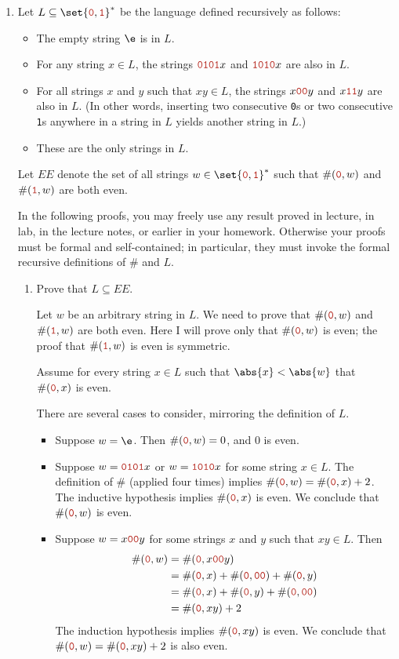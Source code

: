 \documentclass[11pt]{article}
\def\Sym#1{\texttt{\color{BrickRed}#1}}
\begin{document}
\begin{enumerate}
\newpage
\item
Let $L \subseteq \set{\Sym0, \Sym1}^*$ be the language defined recursively as follows:
\begin{itemize}
\item
The empty string $\e$ is in $L$.
\item
For any string $x\in L$, the strings $\Sym{0101}x$ and $\Sym{1010}x$ are also in $L$.
\item
For all strings $x$ and $y$ such that $xy \in L$, the strings $x\Sym{00}y$ and $x\Sym{11}y$ are also in $L$.  (In other words, inserting two consecutive \Sym0s or two consecutive \Sym1s anywhere in a string in $L$ yields another string in $L$.)
\item
These are the only strings in $L$.
\end{itemize}

Let $EE$ denote the set of all strings $w \in \set{\Sym0, \Sym1}^*$ such that $\#(\Sym0,w)$ and $\#(\Sym1,w)$ are both even.

In the following proofs, you may freely use any result proved in lecture, in lab, in the lecture notes, or earlier in your homework.  Otherwise your proofs must be formal and self-contained; in particular, they must invoke the formal recursive definitions of $\#$ and $L$.


\begin{enumerate}
\item Prove that $L \subseteq EE$.

\begin{Solution}
Let $w$ be an arbitrary string in $L$.  We need to prove that $\#(\Sym0,w)$ and $\#(\Sym1,w)$ are both even.  Here I will prove only that $\#(\Sym0,w)$ is even; the proof that $\#(\Sym1,w)$ is even is symmetric.

Assume for every string $x\in L$ such that $\abs{x}<\abs{w}$ that $\#(\Sym0,x)$ is even.

There are several cases to consider, mirroring the definition of $L$.

\begin{itemize}
\item
Suppose $w = \e$.  Then $\#(\Sym0,w) = 0$, and $0$ is even.
\item
Suppose $w = \Sym{0101}x$ or $w = \Sym{1010}x$ for some string $x\in L$.  The  definition of $\#$ (applied four times) implies $\#(\Sym0, w) = \#(\Sym0, x) + 2$.  The inductive hypothesis implies $\#(\Sym0, x)$ is even.  We conclude that $\#(\Sym0, w)$ is even.

\item
Suppose $w = x\Sym{00}y$ for some strings $x$ and $y$ such that $xy\in L$.  Then
\begin{align*}
	\#(\Sym0, w) 
	&=
	\#(\Sym0, x\Sym{00}y) \\
	&=
	\#(\Sym0, x) + \#(\Sym0, \Sym{00}) + \#(\Sym0, y) \\
	&=
	\#(\Sym0, x) + \#(\Sym0, y) + \#(\Sym0, \Sym{00}) \\
	&=
	\#(\Sym0, xy) + 2
\end{align*}
The induction hypothesis implies $\#(\Sym0, xy)$ is even.  We conclude that $\#(\Sym0, w) = \#(\Sym0, xy) + 2$ is also even.


\end{itemize}
\end{Solution}
\end{enumerate}
\end{enumerate}
\end{document}
